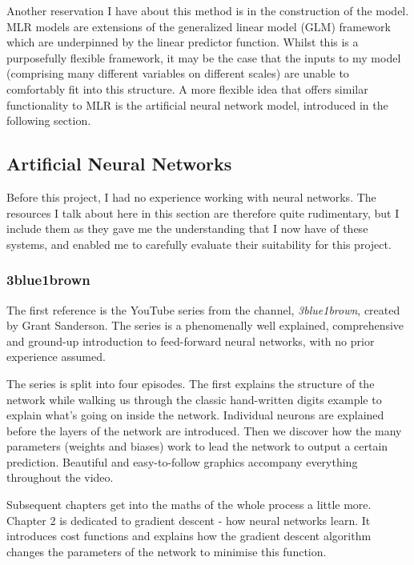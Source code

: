 Another reservation I have about this method is in the construction of the model. MLR models are extensions of the generalized linear model (GLM) framework which are underpinned by the linear predictor function. Whilst this is a purposefully flexible framework, it may be the case that the inputs to my model (comprising many different variables on different scales) are unable to comfortably fit into this structure. A more flexible idea that offers similar functionality to MLR is the artificial neural network model, introduced in the following section.

\subsection{Artificial Neural Networks}

Before this project, I had no experience working with neural networks. The resources I talk about here in this section are therefore quite rudimentary, but I include them as they gave me the understanding that I now have of these systems, and enabled me to carefully evaluate their suitability for this project.

\subsubsection{3blue1brown}

The first reference is the YouTube series \cite{3blue1brown_but_2017} from the channel, \textit{3blue1brown}, created by Grant Sanderson. The series is a phenomenally well explained, comprehensive and ground-up introduction to feed-forward neural networks, with no prior experience assumed.

The series is split into four episodes. The first explains the structure of the network while walking us through the classic hand-written digits example to explain what's going on inside the network. Individual neurons are explained before the layers of the network are introduced. Then we discover how the many parameters (weights and biases) work to lead the network to output a certain prediction. Beautiful and easy-to-follow graphics accompany everything throughout the video.

Subsequent chapters get into the maths of the whole process a little more. Chapter 2 is dedicated to gradient descent - how neural networks learn. It introduces cost functions and explains how the gradient descent algorithm changes the parameters of the network to minimise this function.

